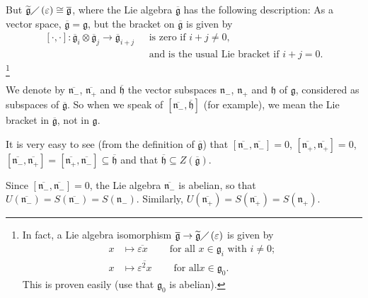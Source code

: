 \documentclass
[numbers=enddot,12pt,final,onecolumn,german,notitlepage]{scrartcl}%
\theoremstyle{definition}
\begin{document}
But $\widetilde{\mathfrak{g}}\diagup\left(  \varepsilon\right)  \cong%
\overline{\mathfrak{g}}$, where the Lie algebra $\overline{\mathfrak{g}}$ has
the following description: As a vector space, $\overline{\mathfrak{g}%
}=\mathfrak{g}$, but the bracket on $\overline{\mathfrak{g}}$ is given by%
\begin{align*}
\left[  \cdot,\cdot\right]  :\overline{\mathfrak{g}}_{i}\otimes\overline
{\mathfrak{g}}_{j}\rightarrow\overline{\mathfrak{g}}_{i+j}\text{ }  &
\text{is }\text{zero if }i+j\neq0\text{,}\\
&  \text{and is the usual Lie bracket if }i+j=0\text{.}%
\end{align*}
\footnote{In fact, a Lie algebra isomorphism $\overline{\mathfrak{g}%
}\rightarrow\widetilde{\mathfrak{g}}\diagup\left(  \varepsilon\right)  $ is
given by%
\begin{align*}
x  &  \mapsto\overline{\varepsilon x}\ \ \ \ \ \ \ \ \ \ \text{for all }%
x\in\mathfrak{g}_{i}\text{ with }i\neq0;\\
x  &  \mapsto\overline{\varepsilon^{2}x}\ \ \ \ \ \ \ \ \ \ \text{for all
}x\in\mathfrak{g}_{0}.
\end{align*}
This is proven easily (use that $\mathfrak{g}_{0}$ is abelian).}

We denote by $\overline{\mathfrak{n}_{-}}$, $\overline{\mathfrak{n}_{+}}$ and
$\overline{\mathfrak{h}}$ the vector subspaces $\mathfrak{n}_{-}$,
$\mathfrak{n}_{+}$ and $\mathfrak{h}$ of $\mathfrak{g}$, considered as
subspaces of $\overline{\mathfrak{g}}$. So when we speak of $\left[
\overline{\mathfrak{n}_{-}},\overline{\mathfrak{h}}\right]  $ (for example),
we mean the Lie bracket in $\overline{\mathfrak{g}}$, not in $\mathfrak{g}$.

It is very easy to see (from the definition of $\overline{\mathfrak{g}}$) that
$\left[  \overline{\mathfrak{n}_{-}},\overline{\mathfrak{n}_{-}}\right]  =0$,
$\left[  \overline{\mathfrak{n}_{+}},\overline{\mathfrak{n}_{+}}\right]  =0$,
$\left[  \overline{\mathfrak{n}_{-}},\overline{\mathfrak{n}_{+}}\right]
=\left[  \overline{\mathfrak{n}_{+}},\overline{\mathfrak{n}_{-}}\right]
\subseteq\overline{\mathfrak{h}}$ and that $\overline{\mathfrak{h}}\subseteq
Z\left(  \overline{\mathfrak{g}}\right)  $.

Since $\left[  \overline{\mathfrak{n}_{-}},\overline{\mathfrak{n}_{-}}\right]
=0$, the Lie algebra $\overline{\mathfrak{n}_{-}}$ is abelian, so that
$U\left(  \overline{\mathfrak{n}_{-}}\right)  =S\left(  \overline
{\mathfrak{n}_{-}}\right)  =S\left(  \mathfrak{n}_{-}\right)  $. Similarly,
$U\left(  \overline{\mathfrak{n}_{+}}\right)  =S\left(  \overline
{\mathfrak{n}_{+}}\right)  =S\left(  \mathfrak{n}_{+}\right)  $.
\end{document}
